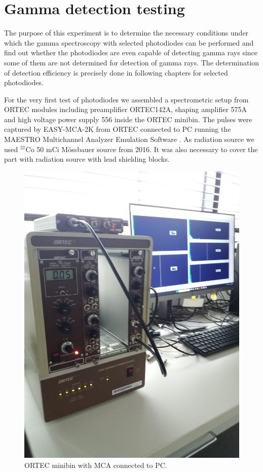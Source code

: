 \chapter{Gamma detection testing}

The purpose of this experiment is to determine the necessary conditions under which the gamma spectroscopy with selected photodiodes can be performed and find out whether the photodiodes are even capable of detecting gamma rays since some of them are not determined for detection of gamma rays. The determination of detection efficiency is precisely done in following chapters for selected photodiodes. 
\par
For the very first test of photodiodes we assembled a spectrometric setup from ORTEC modules including preamplifier ORTEC142A, shaping amplifier 575A and high voltage power supply 556 inside the ORTEC minibin. The pulses were captured by EASY-MCA-2K from ORTEC connected to PC running the MAESTRO Multichannel Analyzer Emulation Software \cite{maestro}. As radiation source we used $^{57}$Co 50 mCi Mössbauer source from 2016. It was also necessary to cover the part with radiation source with lead shielding blocks.


\begin{figure}[H]
 \centering
 \includegraphics[scale=0.09, angle = 270]{./pictures/ORTECbin.jpg}
 \caption{ORTEC minibin with MCA connected to PC.}
 \label{minibin}
 
\end{figure}




